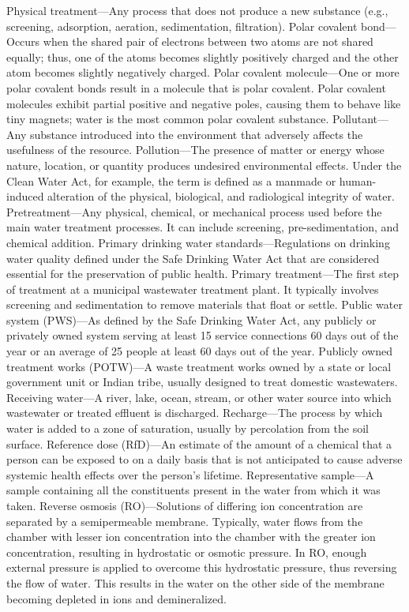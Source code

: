 \documentclass{article}
\begin{document}
Physical treatment---Any process that does not produce a new substance
(e.g., screening, adsorption, aeration, sedimentation, filtration).
Polar covalent bond---Occurs when the shared pair of electrons between
two atoms are not shared equally; thus, one of the atoms becomes
slightly positively charged and the other atom becomes slightly
negatively charged. Polar covalent molecule---One or more polar covalent
bonds result in a molecule that is polar covalent. Polar covalent
molecules exhibit partial positive and negative poles, causing them to
behave like tiny magnets; water is the most common polar covalent
substance. Pollutant---Any substance introduced into the environment
that adversely affects the usefulness of the resource. Pollution---The
presence of matter or energy whose nature, location, or quantity
produces undesired environmental effects. Under the Clean Water Act, for
example, the term is defined as a manmade or human-induced alteration of
the physical, biological, and radiological integrity of water.
Pretreatment---Any physical, chemical, or mechanical process used before
the main water treatment processes. It can include screening,
pre-sedimentation, and chemical addition. Primary drinking water
standards---Regulations on drinking water quality defined under the Safe
Drinking Water Act that are considered essential for the preservation of
public health. Primary treatment---The first step of treatment at a
municipal wastewater treatment plant. It typically involves screening
and sedimentation to remove materials that float or settle. Public water
system (PWS)---As defined by the Safe Drinking Water Act, any publicly
or privately owned system serving at least 15 service connections 60
days out of the year or an average of 25 people at least 60 days out of
the year. Publicly owned treatment works (POTW)---A waste treatment
works owned by a state or local government unit or Indian tribe, usually
designed to treat domestic wastewaters. Receiving water---A river, lake,
ocean, stream, or other water source into which wastewater or treated
effluent is discharged. Recharge---The process by which water is added
to a zone of saturation, usually by percolation from the soil surface.
Reference dose (RfD)---An estimate of the amount of a chemical that a
person can be exposed to on a daily basis that is not anticipated to
cause adverse systemic health effects over the person's lifetime.
Representative sample---A sample containing all the constituents present
in the water from which it was taken. Reverse osmosis (RO)---Solutions
of differing ion concentration are separated by a semipermeable
membrane. Typically, water flows from the chamber with lesser ion
concentration into the chamber with the greater ion concentration,
resulting in hydrostatic or osmotic pressure. In RO, enough external
pressure is applied to overcome this hydrostatic pressure, thus
reversing the flow of water. This results in the water on the other side
of the membrane becoming depleted in ions and demineralized.
\end{document}
